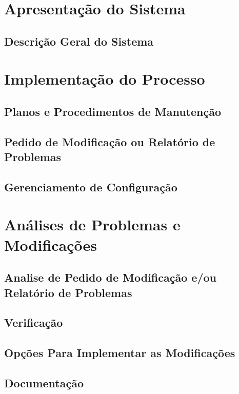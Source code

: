 \documentclass{article}
\begin{document}
\section{Apresentação do Sistema}

	\subsection{Descrição Geral do Sistema}

\section{Implementação do Processo}

	\subsection{Planos e Procedimentos de Manutenção}


	\subsection{Pedido de Modificação ou Relatório de Problemas}


	\subsection{Gerenciamento de Configuração}

\section{Análises de Problemas e Modificações}

	\subsection{Analise de Pedido de Modificação e/ou Relatório de Problemas}
	
	\subsection{Verificação}
	
	\subsection{Opções Para Implementar as Modificações}

	\subsection{Documentação}
	
\end{document}
